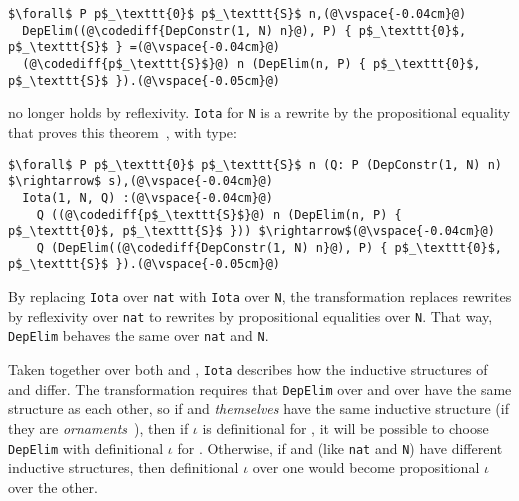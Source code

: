 \begin{lstlisting}
$\forall$ P p$_\texttt{0}$ p$_\texttt{S}$ n,(@\vspace{-0.04cm}@)
  DepElim((@\codediff{DepConstr(1, N) n}@), P) { p$_\texttt{0}$, p$_\texttt{S}$ } =(@\vspace{-0.04cm}@)
  (@\codediff{p$_\texttt{S}$}@) n (DepElim(n, P) { p$_\texttt{0}$, p$_\texttt{S}$ }).(@\vspace{-0.05cm}@)
\end{lstlisting}
no longer holds by reflexivity.
\lstinline{Iota} for \lstinline{N} is a rewrite by the propositional equality that proves this theorem~\href{https://github.com/uwplse/pumpkin-pi/blob/v2.0.0/plugin/coq/nonorn.v}{},
with type:

\begin{lstlisting}
$\forall$ P p$_\texttt{0}$ p$_\texttt{S}$ n (Q: P (DepConstr(1, N) n) $\rightarrow$ s),(@\vspace{-0.04cm}@)
  Iota(1, N, Q) :(@\vspace{-0.04cm}@)
    Q ((@\codediff{p$_\texttt{S}$}@) n (DepElim(n, P) { p$_\texttt{0}$, p$_\texttt{S}$ })) $\rightarrow$(@\vspace{-0.04cm}@)
    Q (DepElim((@\codediff{DepConstr(1, N) n}@), P) { p$_\texttt{0}$, p$_\texttt{S}$ }).(@\vspace{-0.05cm}@)
\end{lstlisting}
By replacing \lstinline{Iota} over \lstinline{nat} with \lstinline{Iota} over \lstinline{N},
the transformation replaces rewrites by reflexivity over \lstinline{nat} to rewrites by propositional equalities over \lstinline{N}.
That way, \lstinline{DepElim} behaves the same over \lstinline{nat} and \lstinline{N}.

Taken together over both \A and \B, \lstinline{Iota} describes how the inductive structures of \A and \B differ.
The transformation requires that \lstinline{DepElim} over \A and over \B have the same structure
as each other, so if \A and \B \textit{themselves} have the same 
inductive structure (if they are \textit{ornaments}~\cite{mcbride}),
then if $\iota$ is definitional for \A, it will be possible to choose
\lstinline{DepElim} with definitional $\iota$ for \B.
Otherwise, if \A and \B (like \lstinline{nat} and \lstinline{N}) have different inductive structures,
then definitional $\iota$ over one would become propositional $\iota$ over the other.


